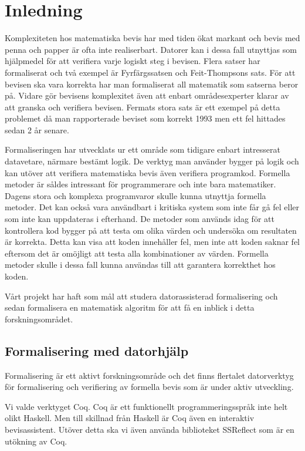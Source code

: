 \section{Inledning}
Komplexiteten hos matematiska bevis har med tiden ökat markant och bevis med
penna och papper är ofta inte realiserbart. Datorer kan i dessa fall utnyttjas
som hjälpmedel för att verifiera varje logiskt steg i bevisen. Flera satser har
formaliserat och två exempel är Fyrfärgssatsen\cite{gonthier2008formal} och
Feit-Thompsons sats\cite{something}. För att bevisen ska vara korrekta har man
formaliserat all matematik som satserna beror på. Vidare gör bevisens
komplexitet även att enbart områdesexperter klarar av att granska och verifiera
bevisen. Fermats stora sats är ett exempel på detta problemet då man
rapporterade beviset som korrekt 1993 men ett fel hittades sedan 2 år
senare\cite{something}.

Formaliseringen har utvecklats ur ett område som tidigare enbart intresserat
datavetare, närmare bestämt logik. De verktyg man använder bygger på logik och
kan utöver att verifiera matematiska bevis även verifiera programkod. Formella
metoder är såldes intressant för programmerare och inte bara matematiker.
Dagens stora och komplexa programvaror skulle kunna utnyttja formella metoder.
Det kan också vara användbart i kritiska system som inte får gå fel eller som
inte kan uppdateras i efterhand. De metoder som används idag för att
kontrollera kod bygger på att testa om olika värden och undersöka om resultaten
är korrekta. Detta kan visa att koden innehåller fel, men inte att koden saknar
fel eftersom det är omöjligt att testa alla kombinationer av värden. Formella
metoder skulle i dessa fall kunna användas till att garantera korrekthet hos
koden.

Vårt projekt har haft som mål att studera datorassisterad formalisering och
sedan formalisera en matematisk algoritm för att få en inblick i detta
forskningsområdet.

\subsection{Formalisering med datorhjälp}
Formalisering är ett aktivt forskningsområde och det finns flertalet
datorverktyg för formalisering och verifiering av formella bevis som är under
aktiv utveckling.

Vi valde verktyget Coq. Coq är ett funktionellt programmeringsspråk inte helt
olikt Haskell. Men till skillnad från Haskell är Coq även en interaktiv
bevisassistent. Utöver detta ska vi även använda biblioteket SSReflect som är
en utökning av Coq.

